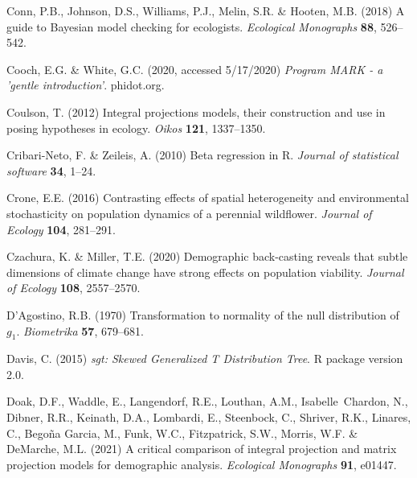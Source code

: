 \documentclass[12pt]{article}
\begin{document}
\begin{spacing}{1.9}
\begin{thebibliography}{62}
Conn, P.B., Johnson, D.S., Williams, P.J., Melin, S.R. \& Hooten, M.B. (2018) A
  guide to {B}ayesian model checking for ecologists. \emph{Ecological
  Monographs} \textbf{88}, 526--542.

Cooch, E.G. \& White, G.C. (2020, accessed 5/17/2020) \emph{Program MARK - a
  'gentle introduction'}. phidot.org.

Coulson, T. (2012) {I}ntegral projections models, their construction and use in
  posing hypotheses in ecology. \emph{Oikos} \textbf{121}, 1337--1350.

Cribari-Neto, F. \& Zeileis, A. (2010) Beta regression in {R}. \emph{Journal of
  statistical software} \textbf{34}, 1--24.

Crone, E.E. (2016) Contrasting effects of spatial heterogeneity and
  environmental stochasticity on population dynamics of a perennial wildflower.
  \emph{Journal of Ecology} \textbf{104}, 281--291.

Czachura, K. \& Miller, T.E. (2020) Demographic back-casting reveals that
  subtle dimensions of climate change have strong effects on population
  viability. \emph{Journal of Ecology} \textbf{108}, 2557--2570.

D'Agostino, R.B. (1970) Transformation to normality of the null distribution of
 $g_1$. \emph{Biometrika} \textbf{57}, 679--681.

Davis, C. (2015) \emph{sgt: Skewed Generalized T Distribution Tree}. R package
  version 2.0.

Doak, D.F., Waddle, E., Langendorf, R.E., Louthan, A.M., Isabelle~Chardon, N.,
  Dibner, R.R., Keinath, D.A., Lombardi, E., Steenbock, C., Shriver, R.K.,
  Linares, C., Bego\~{n}a Garcia, M., Funk, W.C., Fitzpatrick, S.W., Morris,
  W.F. \& DeMarche, M.L. (2021) A critical comparison of integral projection
  and matrix projection models for demographic analysis. \emph{Ecological
  Monographs} \textbf{91}, e01447.


\end{thebibliography}
\end{spacing}
\end{document}
